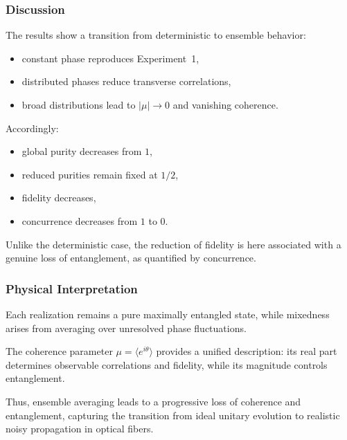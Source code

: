 \documentclass[a4paper]{article}
\begin{document}

\subsubsection{Discussion}

The results show a transition from deterministic to ensemble behavior:
\begin{itemize}
\item constant phase reproduces Experiment~1,
\item distributed phases reduce transverse correlations,
\item broad distributions lead to \( |\mu| \to 0 \) and vanishing coherence.
\end{itemize}

Accordingly:
\begin{itemize}
\item global purity decreases from \(1\),
\item reduced purities remain fixed at \(1/2\),
\item fidelity decreases,
\item concurrence decreases from \(1\) to \(0\).
\end{itemize}

Unlike the deterministic case, the reduction of fidelity is here associated with a genuine loss of entanglement, as quantified by concurrence.


\subsubsection{Physical Interpretation}

Each realization remains a pure maximally entangled state, while mixedness arises from averaging over unresolved phase fluctuations.

The coherence parameter \( \mu = \langle e^{i\theta} \rangle \) provides a unified description: its real part determines observable correlations and fidelity, while its magnitude controls entanglement.

Thus, ensemble averaging leads to a progressive loss of coherence and entanglement, capturing the transition from ideal unitary evolution to realistic noisy propagation in optical fibers.
\end{document}
